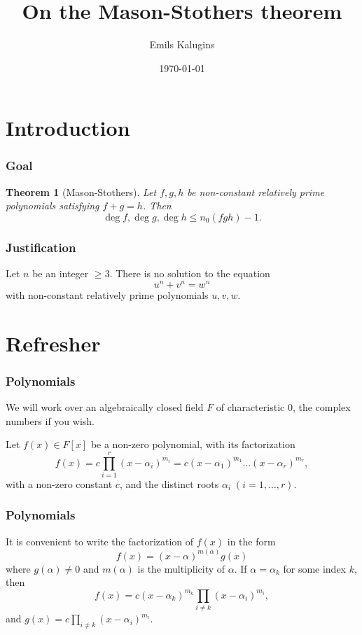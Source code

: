\documentclass[envcountsect]{beamer}
\author{Emils Kalugins}
\title{On the Mason-Stothers theorem}
\institute{University of Latvia}
\date{\today}
\newtheorem*{theorem*}{Theorem}
\begin{document}
\begin{frame}
\maketitle

\end{frame}

\section{Introduction}

\begin{frame}
\frametitle{Goal}

\begin{theorem*}[Mason-Stothers]
Let $f,g,h$ be non-constant relatively prime polynomials satisfying $f+g=h$.
Then \[\operatorname{deg}f, \operatorname{deg}g, \operatorname{deg}h \leq
  n_0(fgh) -1.\]
\end{theorem*}
\end{frame}

\begin{frame}
\frametitle{Justification}
\begin{theorem}
Let $n$ be an integer $\geq 3.$ There is no solution to the equation \[u^n +
  v^n = w^n\] with non-constant relatively prime polynomials $u,v,w$. 
\end{theorem}

\end{frame}

\section{Refresher}
\begin{frame}
\frametitle{Polynomials}
We will work over an algebraically closed field $F$ of characteristic 0, the complex
numbers if you wish.

Let $f(x) \in F[x]$ be a non-zero polynomial, with its factorization
\begin{equation} \label{eq:fac}
  f(x) = c\prod_{i=1}^r(x-\alpha_i)^{m_i}=c(x-\alpha_1)^{m_{1}} \dots (x-\alpha_r)^{m_r},
\end{equation}
with a non-zero constant $c$, and the distinct roots $\alpha_i \; (i=1,\dots,r).$
\end{frame}

\begin{frame}
\frametitle{Polynomials}

It is convenient to write the factorization of $f(x)$ in the form
\[
  f(x) = (x-\alpha)^{m(\alpha)}g(x)
\]
where \( g ( \alpha ) \neq 0 \) and $ m ( \alpha ) $ is the
multiplicity of $\alpha$. If $ \alpha = \alpha_k $ for some index $k$, then
\[
f(x) = c(x- \alpha_k )^{m_k}\prod_{i \neq k}(x-\alpha_i)^{m_i},
\]
and $g(x) = c\prod\limits_{i \neq k}(x-\alpha_i)^{m_i}$.


\end{frame}
\end{document}
